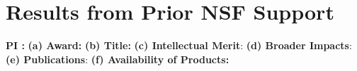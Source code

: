 \section{Results from Prior NSF Support}
\label{sec:prior_results}

\noindent
\textbf{PI :} 
\textbf{(a) Award:} 
\textbf{(b) Title:} 
\textbf{(c) Intellectual Merit}:
\textbf{(d) Broader Impacts}:
\textbf{(e) Publications}:
\textbf{(f) Availability of Products:} 


